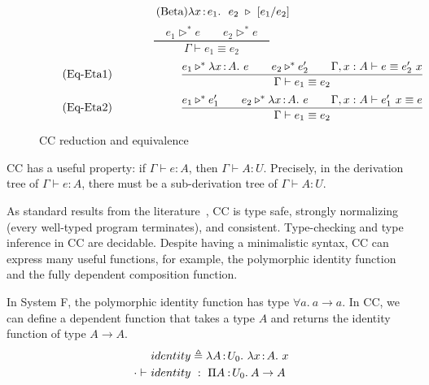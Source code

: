 \begin{figure}
	\begin{equation*}
		\tag{Beta}
		\lambda x\hspace{0.5mm}{:}\hspace{0.5mm} e_1.\ \ e_2 \ \triangleright \ [e_1\slash e_2]
	\end{equation*}
	\begin{equation}
		\tag{Eq-eq}
		\frac
			{\quad e_1 \triangleright^* e \qquad e_ 2\triangleright^* e \quad}
			{\Gamma \vdash e_1 \equiv e_2}
	\end{equation}
	\begin{equation}
		\tag{Eq-Eta1}
		\qquad\qquad\qquad
		\frac
			{e_1 \triangleright^* \lambda x\hspace{0.5mm}{:}\hspace{0.5mm} A.\ e \qquad
			 e_2 \triangleright^* e_2' \qquad
			 \Gamma, x : A \vdash e \equiv e_2'\ x}
			{\Gamma \vdash e_1 \equiv e_2}
	\end{equation}
	\begin{equation}
		\tag{Eq-Eta2}
		\qquad\qquad\qquad
		\frac
			{ e_1 \triangleright^* e_1' \qquad
			 e_2 \triangleright^* \lambda x\hspace{0.5mm}{:}\hspace{0.5mm} A.\ e \qquad
			 \Gamma, x : A \vdash e_1'\ x \equiv e }
			{\Gamma \vdash e_1 \equiv e_2}
	\end{equation}
	\caption{CC reduction and equivalence}
    \label{fig:cc equivalence}
\end{figure}



CC has a useful property: if $\Gamma \vdash e : A$, then $\Gamma \vdash A : U$. Precisely, in the derivation tree of $\Gamma \vdash e : A$, there must be a sub-derivation tree of $\Gamma \vdash A : U$.

As standard results from the literature~\cite{DBLP:journals/iandc/CoquandH88,DBLP:phd/ethos/Luo90}, CC is type safe, strongly normalizing (every well-typed program terminates), and consistent. Type-checking and type inference in CC are decidable. Despite having a minimalistic syntax, CC can express many useful functions, for example, the polymorphic identity function and the fully dependent composition function.

\begin{exmp}
In System F, the polymorphic identity function has type $\forall a.\ a \rightarrow a$. In CC, we can define a  dependent function that takes a type $A$ and returns the identity function of type $A \rightarrow A$.
	\begin{align*}
		&identity \triangleq \lambda A\hspace{0.5mm}{:}\hspace{0.5mm} U_0.\ \lambda x\hspace{0.5mm}{:}\hspace{0.5mm} A.\ x \\
		\cdot \vdash\ &identity\ :\ \Pi A\mkern1.5mu{\hspace{0.5mm}{:}\hspace{0.5mm}} U_0.\hspace{0.8mm}A \rightarrow A
	\end{align*}
\end{exmp}

